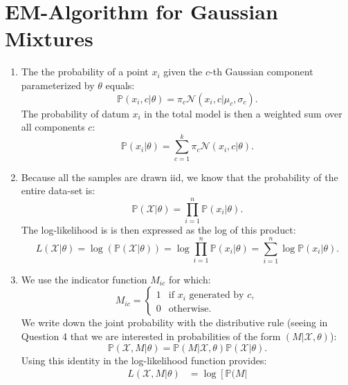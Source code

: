 \documentclass{article}
\begin{document}
\section{EM-Algorithm for Gaussian Mixtures}
\begin{enumerate}[(1)]
    \item The the probability of a point $x_i$ given the $c$-th Gaussian component parameterized by $\theta$ equals:
    \begin{equation}
        \mathbb{P}(x_i,c|\theta) = \pi_c \mathcal{N}(x_i,c|\mu_c,\sigma_c).
    \end{equation}
    The probability of datum $x_i$ in the total model is then a weighted sum over all components $c$:
    \begin{equation}
        \mathbb{P}(x_i|\theta) = \sum_{c=1}^k\pi_c  \mathcal{N}(x_i,c|\theta).
    \end{equation}
    \item Because all the samples are drawn iid, we know that the probability of the entire data-set is:
    \begin{equation}
        \mathbb{P}(\mathcal{X}|\theta) = \prod_{i=1}^n \mathbb{P}(x_i|\theta).
    \end{equation}
    The log-likelihood is is then expressed as the log of this product:
    \begin{equation}
        L(\mathcal{X}|\theta) = \log(\mathbb{P}(\mathcal{X}|\theta)) = \log\prod_{i=1}^n \mathbb{P}(x_i|\theta) = \sum_{i=1}^n\log \mathbb{P}(x_i|\theta).
    \end{equation}
    \item We use the indicator function $M_{ic}$ for which:
    \begin{equation}
        M_{ic}=\begin{cases} 1 & \text{if }x_i\text{ generated by }c, \\ 0 & \text{otherwise}. \end{cases}
    \end{equation}
    We write down the joint probability with the distributive rule (seeing in Question 4 that we are interested in probabilities of the form $(M|\mathcal{X},\theta)$):
    \begin{equation}
        \mathbb{P}(\mathcal{X},M|\theta) = \mathbb{P}(M|
        \mathcal{X},\theta)\mathbb{P}(\mathcal{X}|\theta).
    \end{equation}
    Using this identity in the log-likelihood function provides:
    \begin{align}
        L(\mathcal{X},M|\theta) &= \log\left[ \mathbb{P}(M|

\end{align}
\end{enumerate}
\end{document}
